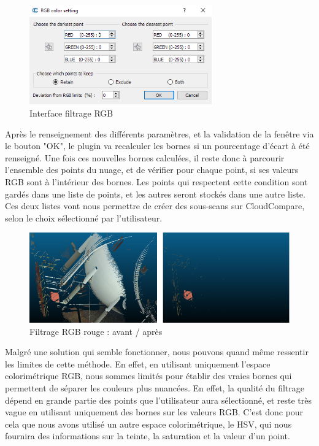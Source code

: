 \documentclass[12pt,titlepage,french]{article}
\begin{document}
\begin{figure}[H]
\center \includegraphics[width=0.7\textwidth]{./img/ui_filter_rgb.png}
  \caption{\label{} Interface filtrage RGB}
\end{figure}

Après le renseignement des différents paramètres, et la validation de la fenêtre via le bouton "OK", le plugin va recalculer les bornes si un pourcentage d'écart à été renseigné. Une fois ces nouvelles bornes calculées, il reste donc à parcourir l'ensemble des points du nuage, et de vérifier pour chaque point, si ses valeurs RGB sont à l'intérieur des bornes. Les points qui respectent cette condition sont gardés dans une liste de points, et les autres seront stockés dans une autre liste. Ces deux listes vont nous permettre de créer des sous-scans sur CloudCompare, selon le choix sélectionné par l'utilisateur.

\begin{figure}[H]
\center
\includegraphics[width=1\textwidth]{./img/rgb_avant_apres.PNG}
\caption{\label{} Filtrage RGB rouge : avant / après}
\end{figure}

Malgré une solution qui semble fonctionner, nous pouvons quand même ressentir les limites de cette méthode. En effet, en utilisant uniquement l'espace colorimétrique RGB, nous sommes limités pour établir des vraies bornes qui permettent de séparer les couleurs plus nuancées. En effet, la qualité du filtrage dépend en grande partie des points que l'utilisateur aura sélectionné, et reste très vague en utilisant uniquement des bornes sur les valeurs RGB. C'est donc pour cela que nous avons utilisé un autre espace colorimétrique, le HSV, qui nous fournira des informations sur la teinte, la saturation et la valeur d'un point.
\end{document}

